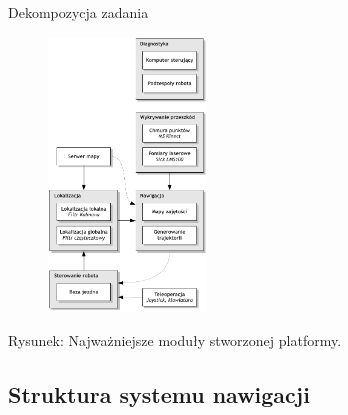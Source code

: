 \documentclass[xcolor=x11names,compress]{beamer}
\renewcommand{\(}{\begin{columns}}
\renewcommand{\)}{\end{columns}}
\newcommand{\<}[1]{\begin{column}{#1}}
\renewcommand{\>}{\end{column}}
\begin{document}
\begin{frame}{Dekompozycja zadania}
\begin{textblock*}{70mm}
\begin{minipage}[l]{70mm}
	\begin{figure}[h!]
    \centering
    \includegraphics[width=4.2cm]{../MSc/img/decomposition_vert}
    \end{figure}
    \end{minipage}
\end{textblock*}

\hspace{3.5cm} \scriptsize \alert{Rysunek:} Najważniejsze moduły stworzonej platformy.

\end{frame}

\subsection{Struktura systemu nawigacji}
\end{document}
